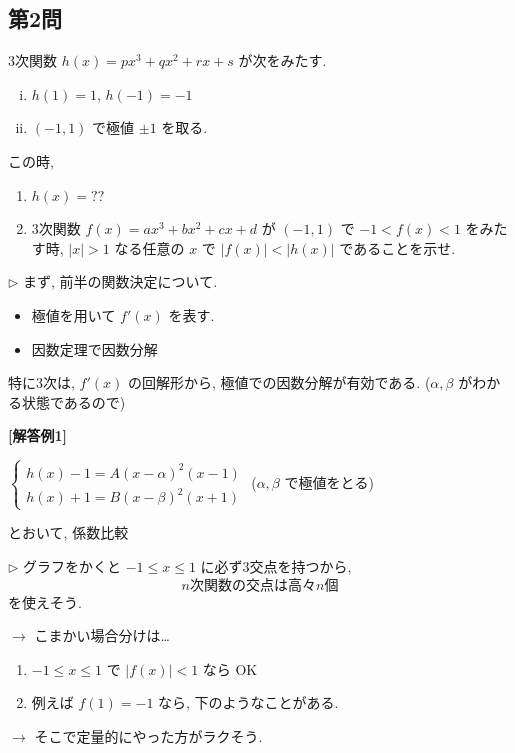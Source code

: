 \documentclass[../main.tex]{subfiles}
\begin{document}
\newpage

\subsection*{第2問}

\begin{center}
  \begin{framed}
    3次関数 $h(x) = px^3 + qx^2 + rx + s$ が次をみたす.
    \begin{enumerate}[(i)]
      \item $h(1) = 1, \, h(-1) = -1$
      \item $(-1, 1)$ で極値 $\pm 1$ を取る.
    \end{enumerate}
    この時,
    \begin{enumerate}[(1)]
      \item $h(x) = ??$
      \item 3次関数 $f(x) = ax^3 + bx^2 + cx + d$ が $(-1, 1)$ で $-1 < f(x) < 1$ をみたす時, $|x| > 1$ なる任意の $x$ で $|f(x)| < |h(x)|$ であることを示せ.
    \end{enumerate}
  \end{framed}
\end{center}

\noindent
$\rhd$ まず, 前半の関数決定について.
\begin{itemize}
  \item 極値を用いて $f'(x)$ を表す.
  \item 因数定理で因数分解
\end{itemize}
特に3次は, $f'(x)$ の回解形から, 極値での因数分解が有効である. ($\alpha, \beta$ がわかる状態であるので)

\begin{center}
  \begin{framed}
    \textbf{[解答例1]}

    $
    \begin{cases}
      h(x) - 1 = A(x-\alpha)^2 (x-1) \\
      h(x) + 1 = B(x-\beta)^2 (x+1)
    \end{cases}$ \quad ($\alpha, \beta$ で極値をとる)

    とおいて, 係数比較
  \end{framed}
\end{center}

\noindent
$\rhd$ グラフをかくと $-1 \le x \le 1$ に必ず3交点を持つから,
\[
  \text{$n$次関数の交点は高々$n$個}
\]
を使えそう.

$\to$ こまかい場合分けは\dots
\begin{enumerate}[(1)]
  \item $-1 \le x \le 1$ で $|f(x)| < 1$ なら OK
  \item 例えば $f(1) = -1$ なら, 下のようなことがある.
\end{enumerate}
$\to$ そこで定量的にやった方がラクそう.
\end{document}
